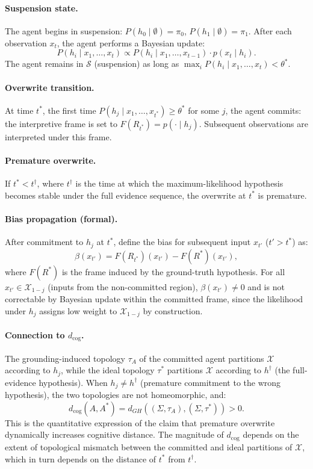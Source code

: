 \documentclass[12pt]{article}
\begin{document}
\paragraph{Suspension state.}
The agent begins in suspension: $P(h_0 \mid \emptyset) = \pi_0$,
$P(h_1 \mid \emptyset) = \pi_1$.
After each observation $x_t$, the agent performs a Bayesian update:
\[
P(h_i \mid x_1, \ldots, x_t) \propto P(h_i \mid x_1, \ldots, x_{t-1}) \cdot p(x_t \mid h_i).
\]
The agent remains in $\mathcal{S}$ (suspension) as long as
$\max_i P(h_i \mid x_1, \ldots, x_t) < \theta^*$.

\paragraph{Overwrite transition.}
At time $t^*$, the first time $P(h_j \mid x_1, \ldots, x_{t^*}) \geq \theta^*$
for some $j$, the agent commits: the interpretive frame is set to
$F(R_{t^*}) = p(\cdot \mid h_j)$. Subsequent observations are
interpreted under this frame.

\paragraph{Premature overwrite.}
If $t^* < t^\dagger$, where $t^\dagger$ is the time at which the
maximum-likelihood hypothesis becomes stable under the full evidence
sequence, the overwrite at $t^*$ is premature.

\paragraph{Bias propagation (formal).}
After commitment to $h_j$ at $t^*$, define the bias for subsequent
input $x_{t'}$ ($t' > t^*$) as:
\[
\beta(x_{t'}) = F(R_{t^*})(x_{t'}) - F(R^*)(x_{t'}),
\]
where $F(R^*)$ is the frame induced by the ground-truth hypothesis.
For all $x_{t'} \in \mathcal{X}_{1-j}$ (inputs from the non-committed
region), $\beta(x_{t'}) \neq 0$ and is not correctable by Bayesian
update within the committed frame, since the likelihood under $h_j$
assigns low weight to $\mathcal{X}_{1-j}$ by construction.

\paragraph{Connection to $d_\mathrm{cog}$.}
The grounding-induced topology $\tau_A$ of the committed agent
partitions $\mathcal{X}$ according to $h_j$, while the ideal topology
$\tau^*$ partitions $\mathcal{X}$ according to $h^\dagger$ (the
full-evidence hypothesis).
When $h_j \neq h^\dagger$ (premature commitment to the wrong hypothesis),
the two topologies are not homeomorphic, and:
\[
d_\mathrm{cog}(A, A^*) = d_{GH}((\Sigma, \tau_A), (\Sigma, \tau^*)) > 0.
\]
This is the quantitative expression of the claim that premature
overwrite dynamically increases cognitive distance.
The magnitude of $d_\mathrm{cog}$ depends on the extent of topological
mismatch between the committed and ideal partitions of $\mathcal{X}$,
which in turn depends on the distance of $t^*$ from $t^\dagger$.
\end{document}
